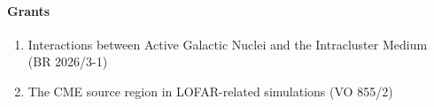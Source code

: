 \paragraph{Grants}
\begin{enumerate}

\item Interactions between Active Galactic Nuclei and the Intracluster Medium
(BR 2026/3-1)

\item The CME source region in LOFAR-related simulations (VO 855/2)

\end{enumerate}
\nocite{2006astro.ph.10874S}
\nocite{2006MNRAS.371..609R}
\nocite{2006astro.ph..9831H}
\nocite{2006MNRAS.369..567R}
\nocite{2006astro.ph..6664H}
\nocite{2006AN....327..587B}


%

